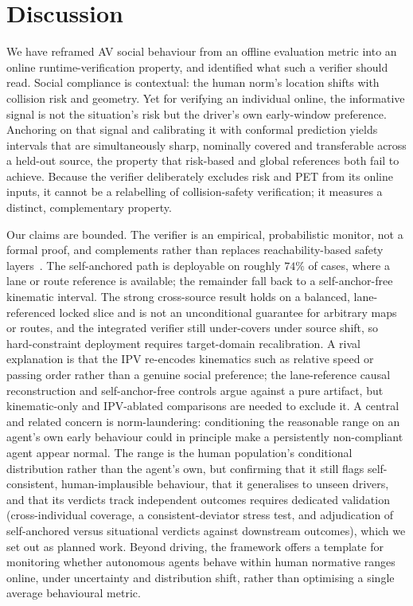 \documentclass[12pt,a4paper]{article}
\begin{document}
\section{Discussion}
We have reframed AV social behaviour from an offline evaluation metric into an online
runtime-verification property, and identified what such a verifier should read. Social
compliance is contextual: the human norm's location shifts with collision risk and geometry.
Yet for verifying an individual online, the informative signal is not the situation's risk
but the driver's own early-window preference. Anchoring on that signal and calibrating it
with conformal prediction yields intervals that are simultaneously sharp, nominally covered
and transferable across a held-out source, the property that risk-based and global
references both fail to achieve. Because the verifier deliberately excludes risk and PET from
its online inputs, it cannot be a relabelling of collision-safety verification; it measures a
distinct, complementary property.

Our claims are bounded. The verifier is an empirical, probabilistic monitor, not a formal
proof, and complements rather than replaces reachability-based safety
layers~\cite{pek2020online}. The self-anchored path is deployable on roughly $74\%$ of cases,
where a lane or route reference is available; the remainder fall back to a self-anchor-free
kinematic interval. The strong cross-source result holds on a balanced, lane-referenced
locked slice and is not an unconditional guarantee for arbitrary maps or routes, and the
integrated verifier still under-covers under source shift, so hard-constraint deployment
requires target-domain recalibration. A rival explanation is that the IPV re-encodes
kinematics such as relative speed or passing order rather than a genuine social preference;
the lane-reference causal reconstruction and self-anchor-free controls argue against a pure
artifact, but kinematic-only and IPV-ablated comparisons are needed to exclude it. A central
and related concern is norm-laundering: conditioning the reasonable range on an agent's own
early behaviour could in principle make a persistently non-compliant agent appear normal. The
range is the human population's conditional distribution rather than the agent's own, but
confirming that it still flags self-consistent, human-implausible behaviour, that it
generalises to unseen drivers, and that its verdicts track independent outcomes requires
dedicated validation (cross-individual coverage, a consistent-deviator stress test, and
adjudication of self-anchored versus situational verdicts against downstream outcomes), which
we set out as planned work. Beyond
driving, the framework offers a template for monitoring whether autonomous agents behave
within human normative ranges online, under uncertainty and distribution shift, rather than
optimising a single average behavioural metric.
\end{document}
